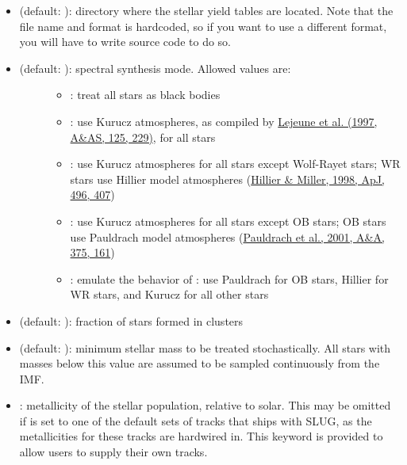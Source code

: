\documentclass[letterpaper,10pt,english]{sphinxmanual}
\begin{document}
\begin{itemize}
\item {} 
 (default: ): directory where the stellar yield tables are located. Note that the file name and format is hardcoded, so if you want to use a different format, you will have to write source code to do so.

\item {} \begin{description}
\item[{ (default: ): spectral synthesis mode. Allowed values are:}] \leavevmode\begin{itemize}
\item {} 
: treat all stars as black bodies

\item {} 
: use Kurucz atmospheres, as compiled by \href{http://adsabs.harvard.edu/abs/1997A\%26AS..125..229L}{Lejeune et al. (1997, A\&AS, 125, 229)}, for all stars

\item {} 
: use Kurucz atmospheres for all stars except Wolf-Rayet stars; WR stars use Hillier model atmospheres (\href{http://adsabs.harvard.edu/abs/1998ApJ...496..407H}{Hillier \& Miller, 1998, ApJ, 496, 407})

\item {} 
: use Kurucz atmospheres for all stars except OB stars; OB stars use Pauldrach model atmospheres (\href{http://adsabs.harvard.edu/abs/2001A\%26A...375..161P}{Pauldrach et al., 2001, A\&A, 375, 161})

\item {} 
: emulate the behavior of : use Pauldrach for OB stars, Hillier for WR stars, and Kurucz for all other stars

\end{itemize}

\end{description}

\item {} 
 (default: ): fraction of stars formed in clusters

\item {} 
 (default: ): minimum stellar mass to be treated stochastically. All stars with masses below this value are assumed to be sampled continuously from the IMF.

\item {} 
: metallicity of the stellar population, relative to solar. This may be omitted if  is set to one of the default sets of tracks that ships with SLUG, as the metallicities for these tracks are hardwired in. This keyword is provided to allow users to supply their own tracks.


\end{itemize}
\end{document}

